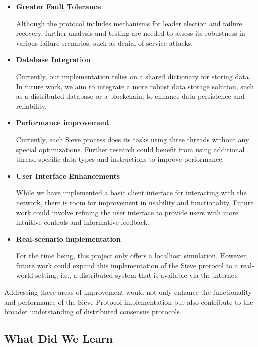 \documentclass{scrartcl}
\begin{document}
\begin{itemize}
    \item \textbf{Greater Fault Tolerance}
    
    Although the protocol includes mechanisms for leader election and failure recovery, further analysis and testing are needed to assess its robustness in various failure scenarios, such as denial-of-service attacks.
    
    \item \textbf{Database Integration}
    
    Currently, our implementation relies on a shared dictionary for storing data. In future work, we aim to integrate a more robust data storage solution, such as a distributed database or a blockchain, to enhance data persistence and reliability.

    \item \textbf{Performance improvement}

    Currently, each Sieve process does its tasks using three threads without any special optimizations. Further research could benefit from using additional thread-specific data types and instructions to improve performance.
    
    \item \textbf{User Interface Enhancements}
    
    While we have implemented a basic client interface for interacting with the network, there is room for improvement in usability and functionality. Future work could involve refining the user interface to provide users with more intuitive controls and informative feedback.

    \item \textbf{Real-scenario implementation}

    For the time being, this project only offers a localhost simulation. However, future work could expand this implementation of the Sieve protocol to a real-world setting, i.e., a distributed system that is available via the internet.
\end{itemize}

Addressing these areas of improvement would not only enhance the functionality and performance of the Sieve Protocol implementation but also contribute to the broader understanding of distributed consensus protocols.

\newpage

\subsection{What Did We Learn}
\end{document}
